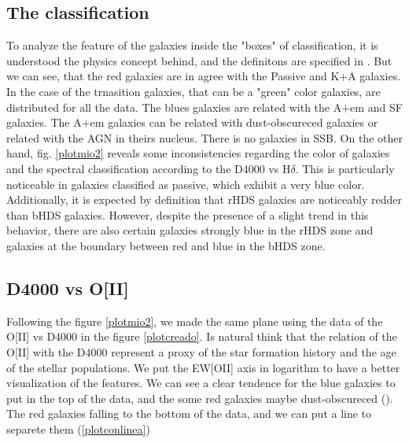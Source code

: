 \documentclass[fleqn,usenatbib]{mnras}
\begin{document}
\subsection{The classification}
To analyze the feature of the galaxies inside the "boxes" of classification, it is understood the physics concept behind, and the definitons are specified in \citet{Balogh}. But we can see, that the red galaxies are in agree with the Passive and K+A galaxies. In the case of the trnasition galaxies, that can be a "green" color galaxies, are distributed for all the data. The blues galaxies are related with the A+em and SF galaxies. The A+em galaxies can be related with dust-obscureced galaxies \citet{poggianti99} or related with the AGN in theirs nucleus. There is no galaxies in SSB. On the other hand, fig. \ref{plotmio2} reveals some inconsistencies regarding the color of galaxies  and the spectral classification according to the D4000 vs H$\delta$. This is particularly noticeable in galaxies classified as passive, which exhibit a very blue color. Additionally, it is expected by definition that rHDS galaxies are noticeably redder than bHDS galaxies. However, despite the presence of a slight trend in this behavior, there are also certain galaxies strongly blue in the rHDS zone and galaxies at the boundary between red and blue in the bHDS zone.

\subsection{D4000 vs O[II]}
Following the figure \ref{plotmio2}, we made the same plane using the data of the O[II] vs D4000 in the figure \ref{plotcreado}. Is natural think that the relation of the O[II] with the D4000 represent a proxy of the star formation history and the age of the stellar populations. We put the EW[OII] axis in logarithm to have a better visualization of the features. We can see a clear tendence for the blue galaxies to put in the top of the data, and the some red galaxies maybe dust-obscureced (\citet{poggianti99}). The red galaxies falling to the bottom of the data, and we can put a line to separete them (\ref{plotconlinea})







\end{document}
